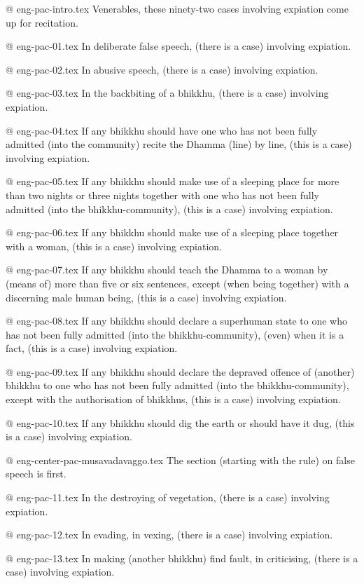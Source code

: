 @ eng-pac-intro.tex
Venerables, these ninety-two cases involving expiation come up for recitation.

@ eng-pac-01.tex
In deliberate false speech, (there is a case) involving expiation.

@ eng-pac-02.tex
In abusive speech, (there is a case) involving expiation.

@ eng-pac-03.tex
In the backbiting of a bhikkhu, (there is a case) involving expiation.

@ eng-pac-04.tex
If any bhikkhu should have one who has not been fully admitted (into the community) recite the Dhamma (line) by line, (this is a case) involving expiation.

@ eng-pac-05.tex
If any bhikkhu should make use of a sleeping place for more than two nights or three nights together with one who has not been fully admitted (into the bhikkhu-community), (this is a case) involving expiation.

@ eng-pac-06.tex
If any bhikkhu should make use of a sleeping place together with a woman, (this is a case) involving expiation.

@ eng-pac-07.tex
If any bhikkhu should teach the Dhamma to a woman by (means of) more than five or six sentences, except (when being together) with a discerning male human being, (this is a case) involving expiation.

@ eng-pac-08.tex
If any bhikkhu should declare a superhuman state to one who has not been fully admitted (into the bhikkhu-community), (even) when it is a fact, (this is a case) involving expiation.

@ eng-pac-09.tex
If any bhikkhu should declare the depraved offence of (another) bhikkhu to one who has not been fully admitted (into the bhikkhu-community), except with the authorisation of bhikkhus, (this is a case) involving expiation.

@ eng-pac-10.tex
If any bhikkhu should dig the earth or should have it dug, (this is a case) involving expiation.

@ eng-center-pac-musavadavaggo.tex
The section (starting with the rule) on false speech is first.

@ eng-pac-11.tex
In the destroying of vegetation, (there is a case) involving expiation.

@ eng-pac-12.tex
In evading, in vexing, (there is a case) involving expiation.

@ eng-pac-13.tex
In making (another bhikkhu) find fault, in criticising, (there is a case) involving expiation.

